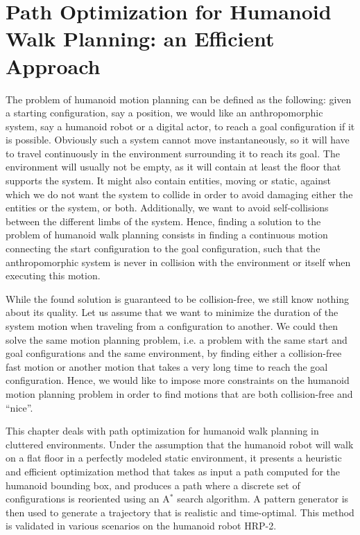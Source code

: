 \chapter{Path Optimization for Humanoid Walk Planning: an Efficient Approach}
\label{chap:path-optim}

The problem of humanoid motion planning can be defined as the
following: given a starting configuration, say a position, we would
like an anthropomorphic system, say a humanoid robot or a digital
actor, to reach a goal configuration if it is possible. Obviously such
a system cannot move instantaneously, so it will have to travel
continuously in the environment surrounding it to reach its goal. The
environment will usually not be empty, as it will contain at least the
floor that supports the system. It might also contain entities, moving
or static, against which we do not want the system to collide in order
to avoid damaging either the entities or the system, or
both. Additionally, we want to avoid self-collisions between the
different limbs of the system. Hence, finding a solution to the
problem of humanoid walk planning consists in finding a continuous
motion connecting the start configuration to the goal configuration,
such that the anthropomorphic system is never in collision with the
environment or itself when executing this motion.

While the found solution is guaranteed to be collision-free, we still
know nothing about its quality. Let us assume that we want to minimize
the duration of the system motion when traveling from a configuration
to another. We could then solve the same motion planning problem,
i.e. a problem with the same start and goal configurations and the
same environment, by finding either a collision-free fast motion or
another motion that takes a very long time to reach the goal
configuration. Hence, we would like to impose more constraints on the
humanoid motion planning problem in order to find motions that are
both collision-free and ``nice''.

This chapter deals with path optimization for humanoid walk planning
in cluttered environments. Under the assumption that the humanoid
robot will walk on a flat floor in a perfectly modeled static
environment, it presents a heuristic and efficient optimization method
that takes as input a path computed for the humanoid bounding box, and
produces a path where a discrete set of configurations is reoriented
using an A$^{*}$ search algorithm. A pattern generator is then used to
generate a trajectory that is realistic and time-optimal. This method
is validated in various scenarios on the humanoid robot HRP-2.

